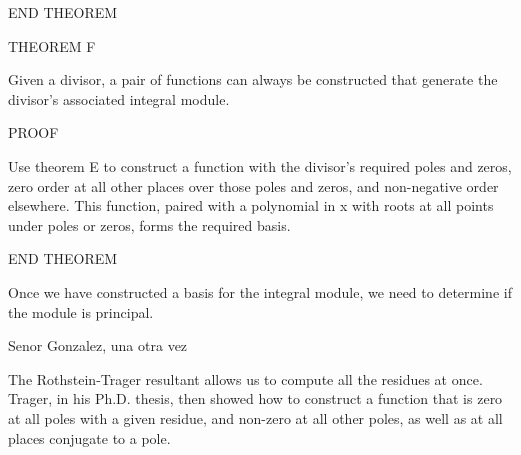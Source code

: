 END THEOREM

THEOREM F

Given a divisor, a pair of functions can always be constructed that
generate the divisor's associated integral module.

PROOF

Use theorem E to construct a function with the divisor's required
poles and zeros, zero order at all other places over those poles
and zeros, and non-negative order elsewhere.  This function,
paired with a polynomial in x with roots at all points under
poles or zeros, forms the required basis.

END THEOREM

Once we have constructed a basis for the integral module, we need to
determine if the module is principal.



Senor Gonzalez, una otra vez

The Rothstein-Trager resultant allows us to compute all the residues
at once.  Trager, in his Ph.D. thesis, then showed how to construct a
function that is zero at all poles with a given residue, and non-zero
at all other poles, as well as at all places conjugate to a pole.
